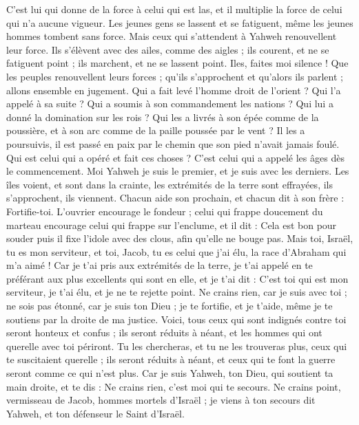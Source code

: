 \begin{multicols}{2}
C'est lui qui donne de la force à celui qui est las, et il multiplie la force de celui qui n'a aucune vigueur.
Les jeunes gens se lassent et se fatiguent, même les jeunes hommes tombent sans force.
Mais ceux qui s'attendent à Yahweh renouvellent leur force. Ils s'élèvent avec des ailes, comme des aigles ; ils courent, et ne se fatiguent point ; ils marchent, et ne se lassent point.
\VerseOne{}Iles, faites moi silence ! Que les peuples renouvellent leurs forces ; qu'ils s'approchent et qu'alors ils parlent ; allons ensemble en jugement.
Qui a fait levé l'homme droit de l'orient ? Qui l'a appelé à sa suite ? Qui a soumis à son commandement les nations ? Qui lui a donné la domination sur les rois ? Qui les a livrés à son épée comme de la poussière, et à son arc comme de la paille poussée par le vent ?
Il les a poursuivis, il est passé en paix par le chemin que son pied n'avait jamais foulé.
Qui est celui qui a opéré et fait ces choses ? C'est celui qui a appelé les âges dès le commencement. Moi Yahweh je suis le premier, et je suis avec les derniers.
Les îles voient, et sont dans la crainte, les extrémités de la terre sont effrayées, ils s'approchent, ils viennent.
Chacun aide son prochain, et chacun dit à son frère : Fortifie-toi.
L'ouvrier encourage le fondeur ; celui qui frappe doucement du marteau encourage celui qui frappe sur l'enclume, et il dit : Cela est bon pour souder puis il fixe l'idole avec des clous, afin qu'elle ne bouge pas.
Mais toi, Israël, tu es mon serviteur, et toi, Jacob, tu es celui que j'ai élu, la race d'Abraham qui m'a aimé !
Car je t'ai pris aux extrémités de la terre, je t'ai appelé en te préférant aux plus excellents qui sont en elle, et je t'ai dit : C'est toi qui est mon serviteur, je t'ai élu, et je ne te rejette point.
Ne crains rien, car je suis avec toi ; ne sois pas étonné, car je suis ton Dieu ; je te fortifie, et je t'aide, même je te soutiens par la droite de ma justice.
Voici, tous ceux qui sont indignés contre toi seront honteux et confus ; ils seront réduits à néant, et les hommes qui ont querelle avec toi périront.
Tu les chercheras, et tu ne les trouveras plus, ceux qui te suscitaient querelle ; ils seront réduits à néant, et ceux qui te font la guerre seront comme ce qui n'est plus.
Car je suis Yahweh, ton Dieu, qui soutient ta main droite, et te dis : Ne crains rien, c'est moi qui te secours.
Ne crains point, vermisseau de Jacob, hommes mortels d'Israël ; je viens à ton secours dit Yahweh, et ton défenseur le Saint d'Israël.

\end{multicols}
